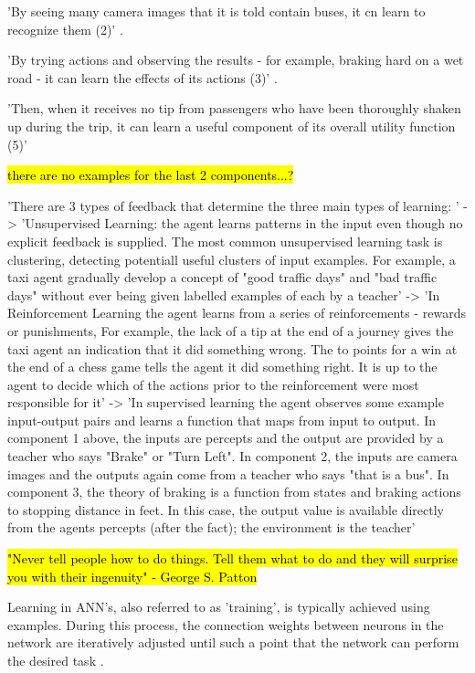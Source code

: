 'By seeing many camera images that it is told contain buses, it cn learn to recognize them (2)' \cite{russell2016artificial}.

'By trying actions and observing the results - for example, braking hard on a wet road - it can learn the effects of its actions (3)' \cite{russell2016artificial}.

'Then, when it receives no tip from passengers who have been thoroughly shaken up during the trip, it can learn a useful component of its overall utility function (5)' \cite{russell2016artificial}

\hl{there are no examples for the last 2 components...?}




'There are 3 types of feedback that determine the three main types of learning: ' \cite{russell2016artificial}
-> 'Unsupervised Learning: the agent learns patterns in the input even though no explicit feedback is supplied. The most common unsupervised learning task is clustering, detecting potentiall useful clusters of input examples. For example, a taxi agent gradually develop a concept of "good traffic days" and "bad traffic days" without ever being given labelled examples of each by a teacher'
-> 'In Reinforcement Learning the agent learns from a series of reinforcements - rewards or punishments, For example, the lack of a tip at the end of a journey gives the taxi agent an indication that it did something wrong. The to points for a win at the end of a chess game tells the agent it did something right. It is up to the agent to decide which of the actions prior to the reinforcement were most responsible for it'
-> 'In supervised learning the agent observes some example input-output pairs and learns a function that maps from input to output. In component 1 above, the inputs are percepts and the output are provided by a teacher who says "Brake" or "Turn Left". In component 2, the inputs are camera images and the outputs again come from a teacher who says "that is a bus". In component 3, the theory of braking is a function from states and braking actions to stopping distance in feet. In this case, the output value is available directly from the agents percepts (after the fact); the environment is the teacher'


\hl{"Never tell people how to do things. Tell them what to do and they will surprise you with their ingenuity" - George S. Patton}


Learning in ANN's, also referred to as 'training', is typically achieved using examples. During this process, the connection weights between neurons in the network are iteratively adjusted until such a point that the network can perform the desired task \cite{XinYao1999}.


